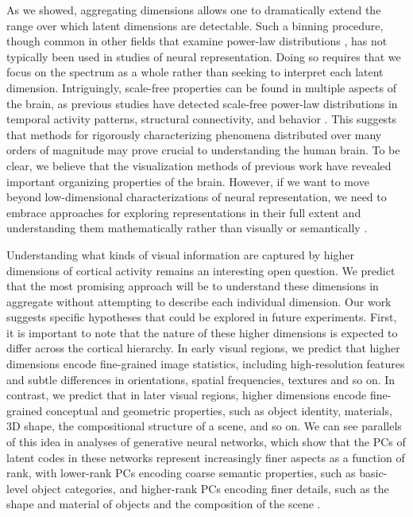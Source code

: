 \documentclass[10pt]{article}
\begin{document}
As we showed, aggregating dimensions allows one to dramatically extend the range over which latent dimensions are detectable. Such a binning procedure, though common in other fields that examine power-law distributions \autocite{Lin2023}, has not typically been used in studies of neural representation. Doing so requires that we focus on the spectrum as a whole rather than seeking to interpret each latent dimension. Intriguingly, scale-free properties can be found in multiple aspects of the brain, as previous studies have detected scale-free power-law distributions in temporal activity patterns, structural connectivity, and behavior \autocite{He2014,Lynn2024,Kello2010}. This suggests that methods for rigorously characterizing phenomena distributed over many orders of magnitude may prove crucial to understanding the human brain. To be clear, we believe that the visualization methods of previous work have revealed important organizing properties of the brain. However, if we want to move beyond low-dimensional characterizations of neural representation, we need to embrace approaches for exploring representations in their full extent and understanding them mathematically rather than visually or semantically \autocite{Roads2024}.

Understanding what kinds of visual information are captured by higher dimensions of cortical activity remains an interesting open question. We predict that the most promising approach will be to understand these dimensions in aggregate without attempting to describe each individual dimension. Our work suggests specific hypotheses that could be explored in future experiments. First, it is important to note that the nature of these higher dimensions is expected to differ across the cortical hierarchy. In early visual regions, we predict that higher dimensions encode fine-grained image statistics, including high-resolution features and subtle differences in orientations, spatial frequencies, textures and so on. In contrast, we predict that in later visual regions, higher dimensions encode fine-grained conceptual and geometric properties, such as object identity, materials, 3D shape, the compositional structure of a scene, and so on. We can see parallels of this idea in analyses of generative neural networks, which show that the PCs of latent codes in these networks represent increasingly finer aspects as a function of rank, with lower-rank PCs encoding coarse semantic properties, such as basic-level object categories, and higher-rank PCs encoding finer details, such as the shape and material of objects and the composition of the scene \autocite{Ramesh2022}.
\end{document}
